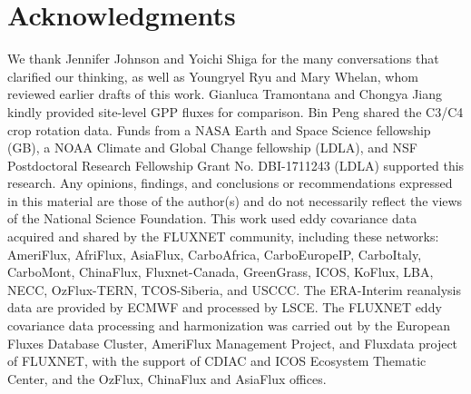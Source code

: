 \documentclass[10pt,letterpaper]{article}
\begin{document}
\section*{Acknowledgments}
We thank Jennifer Johnson and Yoichi Shiga for the many conversations that clarified our thinking, as well as Youngryel Ryu and Mary Whelan, whom reviewed earlier drafts of this work. Gianluca Tramontana and Chongya Jiang kindly provided site-level GPP fluxes for comparison. Bin Peng shared the C3/C4 crop rotation data. Funds from a NASA Earth and Space Science fellowship (GB), a NOAA Climate and Global Change fellowship (LDLA), and NSF
Postdoctoral Research Fellowship Grant No. DBI-1711243 (LDLA) supported this research. Any opinions, findings, and conclusions or recommendations expressed in this material are those of the author(s) and do not necessarily reflect the views of the National Science Foundation. This work used eddy covariance data acquired and shared by the FLUXNET community, including these networks: AmeriFlux, AfriFlux, AsiaFlux, CarboAfrica, CarboEuropeIP, CarboItaly, CarboMont, ChinaFlux, Fluxnet-Canada, GreenGrass, ICOS, KoFlux, LBA, NECC, OzFlux-TERN, TCOS-Siberia, and USCCC. The ERA-Interim reanalysis data are provided by ECMWF and processed by LSCE. The FLUXNET eddy covariance data processing and harmonization was carried out by the European Fluxes Database Cluster, AmeriFlux Management Project, and Fluxdata project of FLUXNET, with the support of CDIAC and ICOS Ecosystem Thematic Center, and the OzFlux, ChinaFlux and AsiaFlux offices.
\nolinenumbers

\printbibliography
\end{document}
